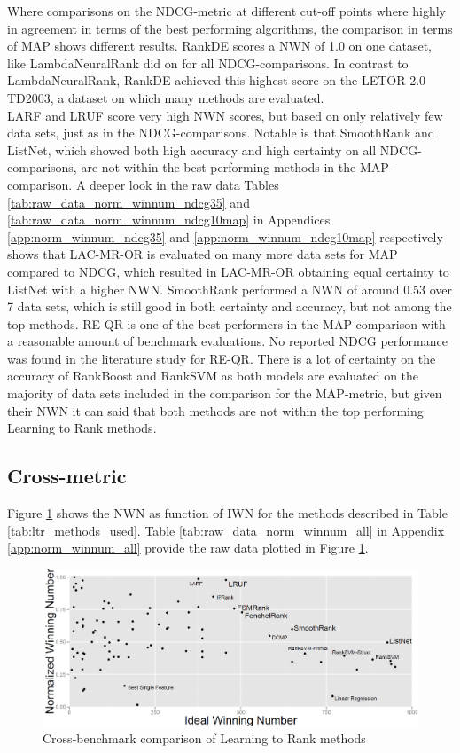 Where comparisons on the \ac{NDCG}-metric at different cut-off points where highly in agreement in terms of the best performing algorithms, the comparison in terms of \ac{MAP} shows different results. RankDE scores a \ac{NWN} of 1.0 on one dataset, like LambdaNeuralRank did on for all \ac{NDCG}-comparisons. In contrast to LambdaNeuralRank, RankDE achieved this highest score on the LETOR 2.0 TD2003, a dataset on which many methods are evaluated.\\

LARF and LRUF score very high \ac{NWN} scores, but based on only relatively few data sets, just as in the \ac{NDCG}-comparisons. Notable is that SmoothRank and ListNet, which showed both high accuracy and high certainty on all \ac{NDCG}-comparisons, are not within the best performing methods in the \ac{MAP}-comparison. A deeper look in the raw data Tables \ref{tab:raw_data_norm_winnum_ndcg35} and \ref{tab:raw_data_norm_winnum_ndcg10map} in Appendices \ref{app:norm_winnum_ndcg35} and \ref{app:norm_winnum_ndcg10map} respectively shows that LAC-MR-OR is evaluated on many more data sets for \ac{MAP} compared to \ac{NDCG}, which resulted in LAC-MR-OR obtaining equal certainty to ListNet with a higher \ac{NWN}. SmoothRank performed a \ac{NWN} of around 0.53 over 7 data sets, which is still good in both certainty and accuracy, but not among the top methods. RE-QR is one of the best performers in the \ac{MAP}-comparison with a reasonable amount of benchmark evaluations. No reported \ac{NDCG} performance was found in the literature study for RE-QR. There is a lot of certainty on the accuracy of RankBoost and Rank\ac{SVM} as both models are evaluated on the majority of data sets included in the comparison for the \ac{MAP}-metric, but given their \ac{NWN} it can said that both methods are not within the top performing Learning to Rank methods.

\subsection{Cross-metric}
Figure \ref{fig:normalised_winning_number_all} shows the \ac{NWN} as function of \ac{IWN} for the methods described in Table \ref{tab:ltr_methods_used}. Table \ref{tab:raw_data_norm_winnum_all} in Appendix \ref{app:norm_winnum_all} provide the raw data plotted in Figure \ref{fig:normalised_winning_number_all}.\\

\begin{figure}[!h]
\includegraphics[scale=0.33]{gfx/combined_normalized_winnum}
\caption{Cross-benchmark comparison of Learning to Rank methods}
\label{fig:normalised_winning_number_all}
\end{figure}

